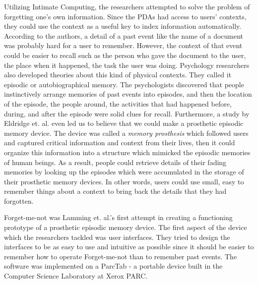 Utilizing Intimate Computing, the researchers attempted to solve the problem of forgetting one's own information. Since the PDAs had access to users' contexts, they could use the context as a useful key to index information automatically. According to the authors, a detail of a past event like the name of a document was probably hard for a user to remember. However, the context of that event could be easier to recall such as the person who gave the document to the user, the place when it happened, the task the user was doing. Psychology researchers also developed theories about this kind of physical contexts. They called it episodic or autobiographical memory. The psychologists discovered that people instinctively arrange memories of past events into episodes, and then the location of the episode, the people around, the activities that had happened before, during, and after the episode were solid clues for recall. Furthermore, a study by Eldridge et. al. \cite{eldridge1994autobiographical} even led us to believe that we could make a prosthetic episodic memory device. The device was called a \textit{memory prosthesis} which followed users and captured critical information and context from their lives, then it could organize this information into a structure which mimicked the episodic memories of human beings. As a result, people could retrieve details of their fading memories by looking up the episodes which were accumulated in the storage of their prosthetic memory devices. In other words, users could use small, easy to remember things about a context to bring back the details that they had forgotten.

Forget-me-not was Lamming et. al.'s first attempt \cite{lamming1994forget} in creating a functioning prototype of a prosthetic episodic memory device. The first aspect of the device which the researchers tackled was user interfaces. They tried to design the interfaces to be as easy to use and intuitive as possible since it should be easier to remember how to operate Forget-me-not than to remember past events. The software was implemented on a ParcTab - a portable device built in the Computer Science Laboratory at Xerox PARC.



